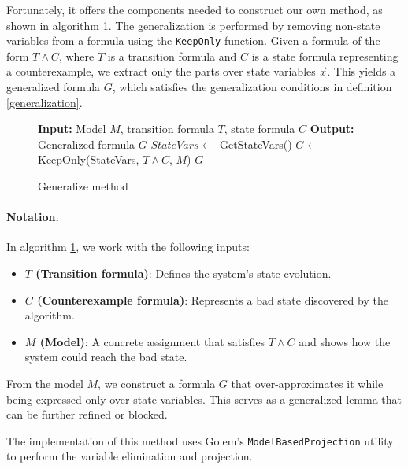 Fortunately, it offers the components needed to construct our own method, as
shown in algorithm \ref{alg:2}. The generalization
is performed by removing non-state variables from a formula using the
\texttt{KeepOnly} function. Given a formula of the form \( T \wedge C \), where
\( T \) is a transition formula and \( C \) is a state formula representing a
counterexample, we extract only the parts over state variables \( \vec{x} \).
This yields a generalized formula \( G \), which satisfies the generalization
conditions in definition \ref{generalization}.

\begin{figure}[H]
    \begin{mdframed}
        \begin{algorithmic}[1]
            \State \textbf{Input:} Model $M$, transition formula $T$, state formula $C$
            \State \textbf{Output:} Generalized formula $G$
            \State $StateVars \gets$ GetStateVars()
            \State $G \gets$ KeepOnly(StateVars, $T \wedge C$, $M$)
            \State \Return $G$
        \end{algorithmic}
    \end{mdframed}
    \caption{Generalize method}\label{alg:2}
\end{figure}

\paragraph{Notation.}
\noindent In algorithm \ref{alg:2}, we work with the following inputs:
\begin{itemize}
    \item \textbf{$T$ (Transition formula)}: Defines the system's state evolution.
    \item \textbf{$C$ (Counterexample formula)}: Represents a bad state discovered by the algorithm.
    \item \textbf{$M$ (Model)}: A concrete assignment that satisfies \( T \wedge C \) and shows how the system could reach the bad state.
\end{itemize}

From the model \( M \), we construct a formula \( G \) that over-approximates
it while being expressed only over state variables. This serves as a
generalized lemma that can be further refined or blocked.

\noindent The implementation of this method uses Golem's
\texttt{ModelBasedProjection} utility to perform the variable elimination and
projection.

